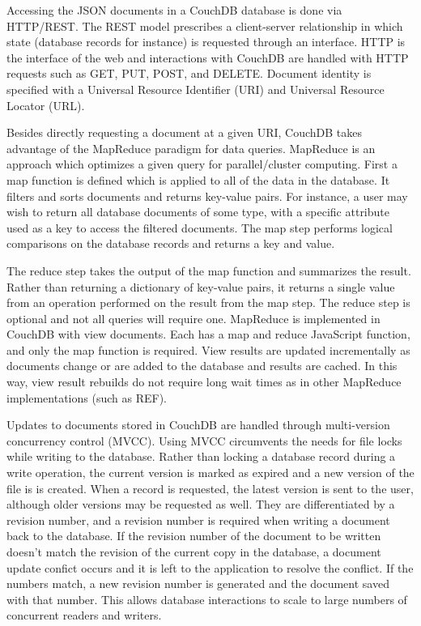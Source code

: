 \documentclass[journal]{IEEEtran}
\begin{document}
Accessing the JSON documents in a CouchDB database is done via HTTP/REST. The REST model prescribes a client-server
relationship in which state (database records for instance) is requested through an interface.
HTTP is the interface of the web and interactions with CouchDB are handled with HTTP
requests such as GET, PUT, POST, and DELETE. Document identity is specified with a Universal Resource Identifier (URI)
and Universal Resource Locator (URL).

Besides directly requesting a document at a given URI, CouchDB takes advantage of the MapReduce paradigm for data
queries. MapReduce is an approach which optimizes a given query for parallel/cluster computing. First a map function
is defined which is applied to all of the data in the database. It filters and sorts documents and returns key-value
pairs. For instance, a user may wish to return all database documents of some type, with a specific attribute used as
a key to access the filtered documents. The map step performs logical comparisons on the database records and
returns a key and value.

The reduce step takes the output of the map function and summarizes the result. Rather than returning a dictionary
of key-value pairs, it returns a single value from an operation performed on the result from the map step. The reduce
step is optional and not all queries will require one. MapReduce is implemented in CouchDB with view documents. Each has
a map and reduce JavaScript function, and only the map function is required. View results are updated incrementally as
documents change or are added to the database and results are cached. In this way, view result rebuilds do not require
long wait times as in other MapReduce implementations (such as REF).

Updates to documents stored in CouchDB are handled through multi-version concurrency control (MVCC). Using MVCC
circumvents the needs for file locks while writing to the database. Rather than locking a database record during
a write operation, the current version is marked as expired and a new version of the file is is created. When a 
record is requested, the latest version is sent to the user, although older versions may be requested as well.
They are differentiated by a revision number, and a revision number is required when writing a document back 
to the database. If the revision number of the document to be written doesn't match the revision of the current
copy in the database,
a document update confict occurs and it is left to the application to resolve the conflict. If the numbers match,
a new revision number is generated and the document saved with that number.
This allows database interactions to scale to large numbers of concurrent readers and writers.
\end{document}
